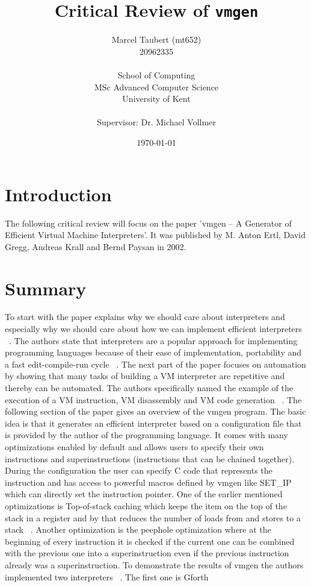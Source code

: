 \documentclass{article}
\title{Critical Review of \texttt{vmgen}}
\author{
    Marcel Taubert  (mt652)\\
    20962335        \\
    \\
    School of Computing \\
    MSc Advanced Computer Science\\
    University of Kent \\
    \\
    Supervisor: Dr. Michael Vollmer
}
\date{\today}
\begin{document}
\maketitle
\clearpage

\section*{Introduction}
The following critical review will focus on the paper 'vmgen -- A Generator of
Efficient Virtual Machine Interpreters'. It was published by M. Anton Ertl,
David Gregg, Andreas Krall and Bernd Paysan in 2002.  

\section{Summary} To start with the paper explains why we should care about
interpreters and especially why we should care about how we can implement
efficient interpreters ~\cite{vmgen}. The authors state that interpreters are a
popular approach for implementing programming languages because of their ease
of implementation, portability and a fast edit-compile-run cycle ~\cite{vmgen}.
The next part of the paper focuses on automation by showing that many tasks of
building a VM interpreter are repetitive and thereby can be automated. The
authors specifically named the example of the execution of a VM instruction, VM
disassembly and VM code generation ~\cite{vmgen}. The following section of the
paper gives an overview of the vmgen program. The basic idea is that it
generates an efficient interpreter based on a configuration file that is
provided by the author of the programming language. It comes with many
optimizations enabled by default and allows users to specify their own
instructions and superinstructions (instructions that can be chained together).
During the configuration the user can specify C code that represents the
instruction and has access to powerful macros defined by vmgen like SET\_IP
which can directly set the instruction pointer. One of the earlier mentioned
optimizations is Top-of-stack caching which keeps the item on the top of the
stack in a register and by that reduces the number of loads from and stores to
a stack ~\cite{vmgen}. Another optimization is the peephole optimization where
at the beginning of every instruction it is checked if the current one can be
combined with the previous one into a superinstruction even if the previous
instruction already was a superinstruction. To demonstrate the results of vmgen
the authors implemented two interpreters ~\cite{vmgen}. The first one is Gforth
\end{document}

